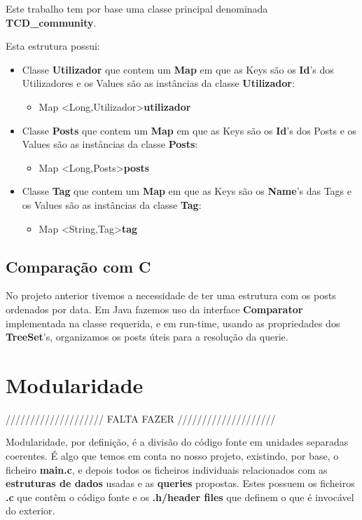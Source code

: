 \documentclass[a4paper]{article}
\begin{document}
Este trabalho tem por base uma classe principal denominada 
\textbf{TCD\_community}.

Esta estrutura possui:
\begin{itemize}
	\item Classe \textbf{Utilizador} que contem um \textbf{Map} em que
    as Keys são os \textbf{Id}'s dos Utilizadores e os Values são as
    instâncias da classe \textbf{Utilizador}:
		\begin{itemize}
          \item Map \textless Long,Utilizador\textgreater \textbf{utilizador}
        \end{itemize}
	\item Classe \textbf{Posts} que contem um \textbf{Map} em que
    as Keys são os \textbf{Id}'s dos Posts e os Values são as
    instâncias da classe \textbf{Posts}:
    	\begin{itemize}
          \item Map \textless Long,Posts\textgreater \textbf{posts}
        \end{itemize}
	\item Classe \textbf{Tag} que contem um \textbf{Map} em que
    as Keys são os \textbf{Name}'s das Tags e os Values são as
    instâncias da classe \textbf{Tag}:
    	\begin{itemize}
          \item Map \textless String,Tag\textgreater \textbf{tag}
        \end{itemize}
\end{itemize}

\subsection{Comparação com C}

No projeto anterior tivemos a necessidade de ter uma estrutura com os 
posts ordenados por data. Em Java fazemos uso da interface 
\textbf{Comparator} implementada na classe requerida, e em run-time, 
usando as propriedades dos \textbf{TreeSet}'s, organizamos os posts 
úteis para a resolução da querie.


\section{Modularidade}
\label{sec:modularidade}

//////////////////// FALTA FAZER ////////////////////

Modularidade, por definição, é a divisão do código fonte em unidades 
separadas coerentes. É algo que temos em conta no nosso projeto,
existindo, por base, o ficheiro \textbf{main.c}, e depois todos os
ficheiros individuais relacionados com as \textbf{estruturas de dados}
usadas e as \textbf{queries} propostas. Estes possuem os ficheiros 
\textbf{.c} que contêm o código fonte e os \textbf{.h/header files} que
definem o que é invocável do exterior.
\end{document}
